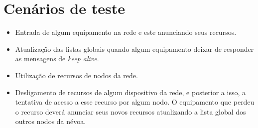 \section{Cenários de teste}

\begin{itemize}
    \item Entrada de algum equipamento na rede e este anunciando seus recursos. 
    \item Atualização das listas globais quando algum equipamento deixar de responder as mensagens de \textit{keep alive}.
    \item Utilização de recursos de nodos da rede.
    \item Desligamento de recursos de algum dispositivo da rede, e posterior a isso, a tentativa de acesso a esse recurso por algum nodo.
    O equipamento que perdeu o recurso deverá anunciar seus novos recursos atualizando a lista global dos outros nodos da névoa.
\end{itemize}










